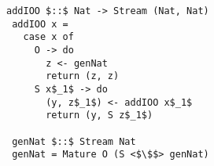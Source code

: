 \begin{figure}[h]
\centering
\begin{minipage}{0.85\columnwidth}
  \begin{lstlisting}[frame=tb]
 addIOO $::$ Nat -> Stream (Nat, Nat)
 addIOO x =
   case x of
     O -> do
       z <- genNat
       return (z, z)
     S x$_1$ -> do
       (y, z$_1$) <- addIOO x$_1$
       return (y, S z$_1$)

 genNat $::$ Stream Nat
 genNat = Mature O (S <$\$$> genNat)
  \end{lstlisting}
\end{minipage}
\end{figure}
